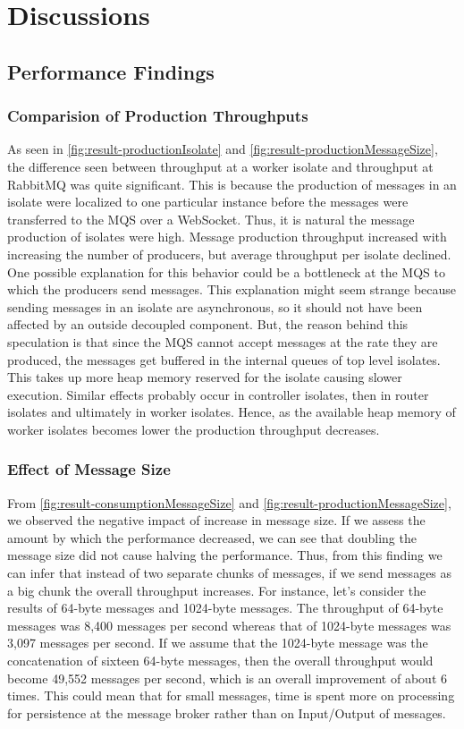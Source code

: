 \chapter{Discussions}\label{chapter:discussions}

\section{Performance Findings}
\subsection{Comparision of Production Throughputs}
  As seen in \autoref{fig:result-productionIsolate} and \autoref{fig:result-productionMessageSize}, the difference seen between throughput at a worker isolate and throughput at RabbitMQ was quite significant. This is because the production of messages in an isolate were localized to one particular instance before the messages were transferred to the MQS over a WebSocket. Thus, it is natural the message production of isolates were high. Message production throughput increased with increasing the number of producers, but average throughput per isolate declined. One possible explanation for this behavior could be a bottleneck at the MQS to which the producers send messages. This explanation might seem strange because sending messages in an isolate are asynchronous, so it should not have been affected by an outside decoupled component. But, the reason behind this speculation is that since the MQS cannot accept messages at the rate they are produced, the messages get buffered in the internal queues of top level isolates. This takes up more heap memory reserved for the isolate causing slower execution. Similar effects probably occur in controller isolates, then in router isolates and ultimately in worker isolates. Hence, as the available heap memory of worker isolates becomes lower the production throughput decreases.

\subsection{Effect of Message Size}
  From \autoref{fig:result-consumptionMessageSize} and \autoref{fig:result-productionMessageSize}, we observed the negative impact of increase in message size. If we assess the amount by which the performance decreased, we can see that doubling the message size did not cause halving the performance. Thus, from this finding we can infer that instead of two separate chunks of messages, if we send messages as a big chunk the overall throughput increases. For instance, let's consider the results of 64-byte messages and 1024-byte messages. The throughput of 64-byte messages was 8,400 messages per second whereas that of 1024-byte messages was 3,097 messages per second. If we assume that the 1024-byte message was the concatenation of sixteen 64-byte messages, then the overall throughput would become 49,552 messages per second, which is an overall improvement of about 6 times. This could mean that for small messages, time is spent more on processing for persistence at the message broker rather than on Input/Output of messages.

